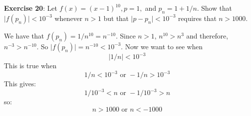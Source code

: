\documentclass{article}
\begin{document}
\textbf{Exercise 20}:
    Let $f(x) = (x - 1)^{10}, p = 1, $ and $p_{n} = 1 + 1 / n$. Show that $\lvert f(p_{n}) \rvert < 10^{-3}$ whenever $n > 1$ but that $\lvert p - p_{n} \rvert < 10^{-3}$ requires that $n > 1000$.
        \begin{answer}
            We have that $f(p_{n}) = 1 / n^{10} = n^{-10}$. Since $n > 1$, $n^{10} > n^{3}$ and therefore, $n^{-3} > n^{-10}$. So $\lvert f(p_{n}) \rvert = n^{-10} < 10^{-3}$. Now we want to see when 
                \begin{equation*}
                    \lvert 1 / n \rvert < 10^{-3}
                \end{equation*}
            This is true when
                \begin{equation*}
                    1 / n < 10^{-3} \text{ or } -1 / n > 10^{-3}
                \end{equation*}
            This gives:
                \begin{equation*}
                    1 / 10^{-3} < n \text{ or } -1 / 10^{-3} > n
                \end{equation*}
            so:
                \begin{equation*}
                    n > 1000 \text{ or } n < -1000
                \end{equation*}

        \end{answer}
\end{document}
